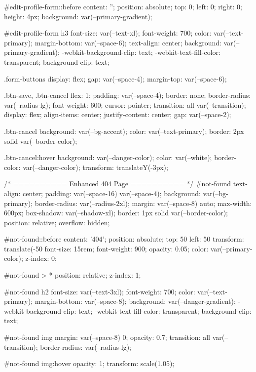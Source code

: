 {{#edit-profile-form::before {
  content: '';
  position: absolute;
  top: 0;
  left: 0;
  right: 0;
  height: 4px;
  background: var(--primary-gradient);
}

#edit-profile-form h3 {
  font-size: var(--text-xl);
  font-weight: 700;
  color: var(--text-primary);
  margin-bottom: var(--space-6);
  text-align: center;
  background: var(--primary-gradient);
  -webkit-background-clip: text;
  -webkit-text-fill-color: transparent;
  background-clip: text;
}

.form-buttons {
  display: flex;
  gap: var(--space-4);
  margin-top: var(--space-6);
}

.btn-save, .btn-cancel {
  flex: 1;
  padding: var(--space-4);
  border: none;
  border-radius: var(--radius-lg);
  font-weight: 600;
  cursor: pointer;
  transition: all var(--transition);
  display: flex;
  align-items: center;
  justify-content: center;
  gap: var(--space-2);
}

.btn-cancel {
  background: var(--bg-accent);
  color: var(--text-primary);
  border: 2px solid var(--border-color);
}

.btn-cancel:hover {
  background: var(--danger-color);
  color: var(--white);
  border-color: var(--danger-color);
  transform: translateY(-3px);
}

/* ========== Enhanced 404 Page ========== */
#not-found {
  text-align: center;
  padding: var(--space-16) var(--space-4);
  background: var(--bg-primary);
  border-radius: var(--radius-2xl);
  margin: var(--space-8) auto;
  max-width: 600px;
  box-shadow: var(--shadow-xl);
  border: 1px solid var(--border-color);
  position: relative;
  overflow: hidden;
}

#not-found::before {
  content: '404';
  position: absolute;
  top: 50%
  left: 50%
  transform: translate(-50%
  font-size: 15rem;
  font-weight: 900;
  opacity: 0.05;
  color: var(--primary-color);
  z-index: 0;
}

#not-found > * {
  position: relative;
  z-index: 1;
}

#not-found h2 {
  font-size: var(--text-3xl);
  font-weight: 700;
  color: var(--text-primary);
  margin-bottom: var(--space-8);
  background: var(--danger-gradient);
  -webkit-background-clip: text;
  -webkit-text-fill-color: transparent;
  background-clip: text;
}

#not-found img {
  margin: var(--space-8) 0;
  opacity: 0.7;
  transition: all var(--transition);
  border-radius: var(--radius-lg);
}

#not-found img:hover {
  opacity: 1;
  transform: scale(1.05);
}

}}
